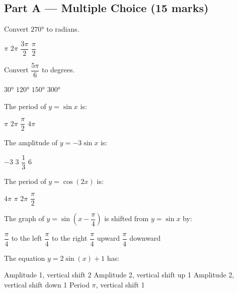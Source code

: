 \documentclass[addpoints]{exam}
\begin{document}
\newpage
\begin{questions}

\section*{Part A --- Multiple Choice (15 marks)}
\vspace{5mm}

\question[1] Convert $\ang{270}$ to radians.
\begin{choices}
    \choice $\pi$
    \choice $2\pi$
    \correctchoice $\dfrac{3\pi}{2}$
    \choice $\dfrac{\pi}{2}$
\end{choices}

\question[1] Convert $\dfrac{5\pi}{6}$ to degrees.
\begin{choices}
    \choice $\ang{30}$
    \choice $\ang{120}$
    \correctchoice $\ang{150}$
    \choice $\ang{300}$
\end{choices}

\question[1] The period of $y = \sin x$ is:
\begin{choices}
    \choice $\pi$
    \correctchoice $2\pi$
    \choice $\dfrac{\pi}{2}$
    \choice $4\pi$
\end{choices}

\question[1] The amplitude of $y = -3\sin x$ is:
\begin{choices}
    \choice $-3$
    \correctchoice $3$
    \choice $\dfrac{1}{3}$
    \choice $6$
\end{choices}

\question[1] The period of $y = \cos(2x)$ is:
\begin{choices}
    \choice $4\pi$
    \correctchoice $\pi$
    \choice $2\pi$
    \choice $\dfrac{\pi}{2}$
\end{choices}

\question[1] The graph of $y = \sin\!\left(x - \dfrac{\pi}{4}\right)$ is shifted from
$y = \sin x$ by:
\begin{choices}
    \choice $\dfrac{\pi}{4}$ to the left
    \correctchoice $\dfrac{\pi}{4}$ to the right
    \choice $\dfrac{\pi}{4}$ upward
    \choice $\dfrac{\pi}{4}$ downward
\end{choices}

\question[1] The equation $y = 2\sin(x) + 1$ has:
\begin{choices}
    \choice Amplitude 1, vertical shift 2
    \correctchoice Amplitude 2, vertical shift up 1
    \choice Amplitude 2, vertical shift down 1
    \choice Period $\pi$, vertical shift 1
\end{choices}


\end{questions}
\end{document}
